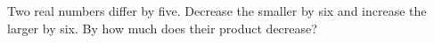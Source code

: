 Two real numbers differ by five. Decrease the smaller by six and increase the larger by six. By how much does their product decrease?
